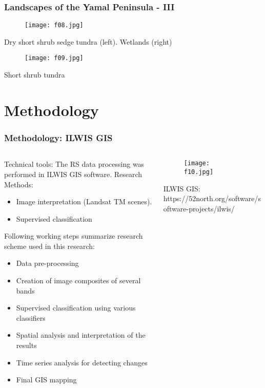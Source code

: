 \documentclass[pdflatex,compress,8pt,
	xcolor={dvipsnames,dvipsnames,svgnames,x11names,table},
	hyperref={colorlinks = true,breaklinks = true, urlcolor = NavyBlue, breaklinks = true}]{beamer}
\begin{document}
\begin{frame}\frametitle{Landscapes of the Yamal Peninsula - III}
\begin{figure}[H]
	\centering
		\texttt{[image: f08.jpg]}
\end{figure}
Dry short shrub sedge tundra (left). Wetlands (right)
\begin{figure}[H]
	\centering
		\texttt{[image: f09.jpg]}
\end{figure}
Short shrub tundra
\end{frame}

\section{Methodology}
\begin{frame}\frametitle{Methodology: ILWIS GIS}
\begin{minipage}[0.4\textheight]{\textwidth}
\begin{columns}[T]
\begin{column}{0.5\textwidth}
Technical tools: The RS data processing was performed in ILWIS GIS software.
Research Methods: 
\begin{itemize}
	\item Image interpretation (Landsat TM scenes).
	\item Supervised classification
\end{itemize}
Following working steps summarize research scheme used in this research:
\begin{itemize}
	\item Data pre-processing
	\item Creation of image composites of several bands
	\item Supervised classification using various classifiers 
	\item Spatial analysis and interpretation of the results
	\item Time series analysis for detecting changes
	\item Final GIS mapping
\end{itemize}
\end{column}
\begin{column}{0.5\textwidth}
\begin{figure}[H]
	\centering
		\texttt{[image: f10.jpg]}
\end{figure}
ILWIS GIS: https://52north.org/software/software-projects/ilwis/
\end{column}
\end{columns}
\end{minipage}
\end{frame}
\end{document}
